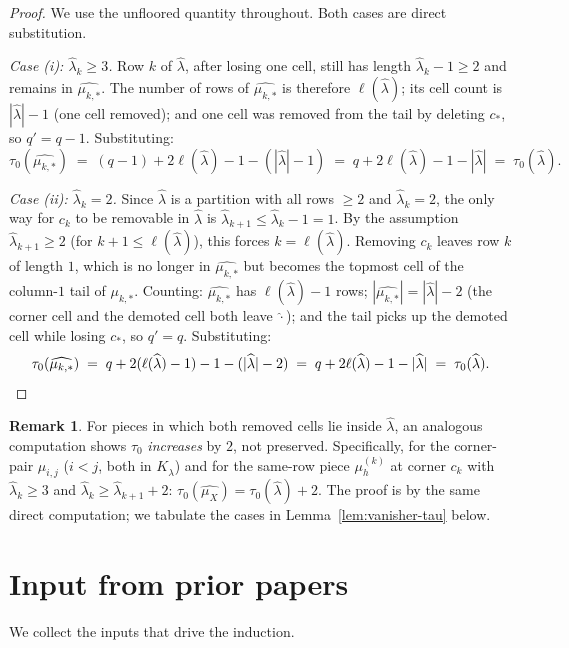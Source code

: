 \documentclass[11pt]{article}
\theoremstyle{definition}
\newtheorem{remark}[theorem]{Remark}
\newcommand{\hatl}{\widehat\lambda}
\newcommand{\elh}{\ell(\hatl)}
\begin{document}
\begin{proof}
We use the unfloored quantity throughout.  Both cases are direct
substitution.

\smallskip\emph{Case (i): $\hatl_k \ge 3$.}
Row $k$ of $\hatl$, after losing one cell, still has length
$\hatl_k - 1 \ge 2$ and remains in $\widehat{\mu_{k,*}}$.  The number
of rows of $\widehat{\mu_{k,*}}$ is therefore $\elh$; its cell count is
$|\hatl| - 1$ (one cell removed); and one cell was removed from the
tail by deleting $c_*$, so $q' = q - 1$.  Substituting:
\[
   \tau_0(\widehat{\mu_{k,*}})
   \;=\; (q-1) + 2\elh - 1 - (|\hatl| - 1)
   \;=\; q + 2\elh - 1 - |\hatl|
   \;=\; \tau_0(\hatl).
\]

\smallskip\emph{Case (ii): $\hatl_k = 2$.}
Since $\hatl$ is a partition with all rows $\ge 2$ and $\hatl_k = 2$,
the only way for $c_k$ to be removable in $\hatl$ is $\hatl_{k+1} \le
\hatl_k - 1 = 1$.  By the assumption $\hatl_{k+1} \ge 2$ (for
$k+1 \le \elh$), this forces $k = \elh$.  Removing $c_k$ leaves row $k$
of length $1$, which is no longer in $\widehat{\mu_{k,*}}$ but becomes
the topmost cell of the column-$1$ tail of $\mu_{k,*}$.  Counting:
$\widehat{\mu_{k,*}}$ has $\elh - 1$ rows; $|\widehat{\mu_{k,*}}| =
|\hatl| - 2$ (the corner cell and the demoted cell both leave
$\hat{\cdot}$); and the tail picks up the demoted cell while losing
$c_*$, so $q' = q$.  Substituting:
\[
   \tau_0(\widehat{\mu_{k,*}})
   \;=\; q + 2(\elh - 1) - 1 - (|\hatl| - 2)
   \;=\; q + 2\elh - 1 - |\hatl|
   \;=\; \tau_0(\hatl).\qedhere
\]
\end{proof}

\begin{remark}\label{rem:vanisher-tau}
For pieces in which both removed cells lie inside $\hatl$, an analogous
computation shows $\tau_0$ \emph{increases} by $2$, not preserved.
Specifically, for the corner-pair $\mu_{i,j}$ ($i < j$, both in
$K_{\hatl}$) and for the same-row piece $\mu_h^{(k)}$ at corner $c_k$
with $\hatl_k \ge 3$ and $\hatl_k \ge \hatl_{k+1} + 2$:
$\tau_0(\widehat{\mu_X}) = \tau_0(\hatl) + 2$.
The proof is by the same direct computation; we tabulate the cases in
Lemma~\ref{lem:vanisher-tau} below.
\end{remark}

\section{Input from prior papers}\label{sec:input}

We collect the inputs that drive the induction.
\end{document}
